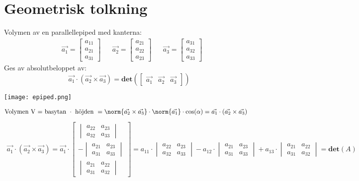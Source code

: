 \section{Geometrisk tolkning} %
\label{sec:geometrisk_tolkning}
Volymen av en parallellepiped med kanterna:
\begin{align*}
 &\vec{a_1} = \begin{bmatrix} a_{11}\\a_{21}\\a_{31} \end{bmatrix}
 &&\vec{a_2} = \begin{bmatrix} a_{21}\\a_{22}\\a_{23} \end{bmatrix}
 &&\vec{a_3} = \begin{bmatrix} a_{31}\\a_{32}\\a_{33} \end{bmatrix}
 \end{align*}
 Ges av absolutbeloppet av:
 \[
     \vec{a_1} \cdot (\vec{a_2} \times \vec{a_3}) = \mathbf{det}(\begin{bmatrix} \vec{a_1}&\vec{a_2}&\vec{a_3} \end{bmatrix})
 \]
\begin{center}
    \texttt{[image: epiped.png]}
\end{center}
\begin{align*}
\mbox{Volymen V = basytan }\cdot\mbox{ höjden } &= \norm{\vec{a_2} \times \vec{a_3}} \cdot \norm{\vec{a_1}} \cdot \cos(\alpha) = \vec{a_1} \cdot (\vec{a_2} \times \vec{a_3})
\end{align*}
\begin{align*}
\vec{a_1} \cdot (\vec{a_2} \times \vec{a_3}) = \vec{a_1} \cdot 
\begin{bmatrix} 
\begin{vmatrix} a_{22}&a_{23}\\a_{32}&a_{33} \end{vmatrix} \\
- \begin{vmatrix} a_{21}&a_{23}\\a_{31}&a_{33} \end{vmatrix} \\
\begin{vmatrix} a_{21}&a_{22}\\a_{31}&a_{32} \end{vmatrix}
\end{bmatrix} = a_{11} \cdot \begin{vmatrix} a_{22}&a_{23}\\a_{32}&a_{33} \end{vmatrix} - a_{12} \cdot \begin{vmatrix} a_{21}&a_{23}\\a_{31}&a_{33} \end{vmatrix} + a_{13} \cdot \begin{vmatrix} a_{21}&a_{22}\\a_{31}&a_{32} \end{vmatrix} = \mathbf{det}(A)
\end{align*}
